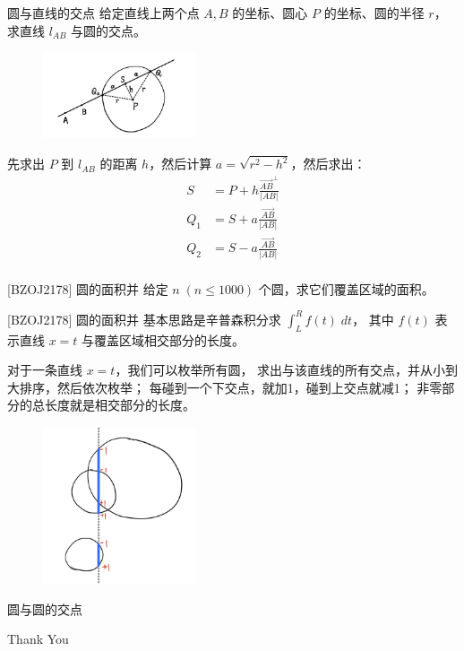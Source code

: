 \documentclass{beamer}
\begin{document}
\begin{frame}{圆与直线的交点}
    \footnotesize
    给定直线上两个点 $A,B$ 的坐标、圆心 $P$ 的坐标、圆的半径 $r$，
    求直线 $l_{AB}$ 与圆的交点。

    \vspace{1em}\pause
    \begin{figure}[H]
        \centering
        \includegraphics[width=0.4\textwidth]{pic/lineIcircle.jpg}
    \end{figure}
    先求出 $P$ 到 $l_{AB}$ 的距离 $h$，然后计算 $a=\sqrt{r^2-h^2}$，然后求出：
    \begin{align}
        S &= P+h \frac{\overrightarrow{AB}^\perp}{|AB|}\\
        Q_1 &= S + a \frac{\overrightarrow{AB}}{|AB|}\\
        Q_2 &= S - a \frac{\overrightarrow{AB}}{|AB|}\\
    \end{align}
\end{frame}

\begin{frame}{[BZOJ2178] 圆的面积并}
    给定 $n\;(n\leq 1000)$ 个圆，求它们覆盖区域的面积。
\end{frame}

\begin{frame}{[BZOJ2178] 圆的面积并}
    \footnotesize
    基本思路是辛普森积分求 $\int_L^R f(t)\; dt$，
    其中 $f(t)$ 表示直线 $x=t$ 与覆盖区域相交部分的长度。
    
    \vspace{1em}\pause
    对于一条直线 $x=t$，我们可以枚举所有圆，
    求出与该直线的所有交点，并从小到大排序，然后依次枚举；
    每碰到一个下交点，就加1，碰到上交点就减1；
    非零部分的总长度就是相交部分的长度。

    \begin{figure}[H]
        \centering
        \includegraphics[width=0.4\textwidth]{pic/circleinsec.jpg}
    \end{figure}
\end{frame}

\begin{frame}{圆与圆的交点}
\end{frame}

\begin{frame}
    \begin{center}
        {\Huge\calligra Thank You}
    \end{center}
\end{frame}
\end{document}
